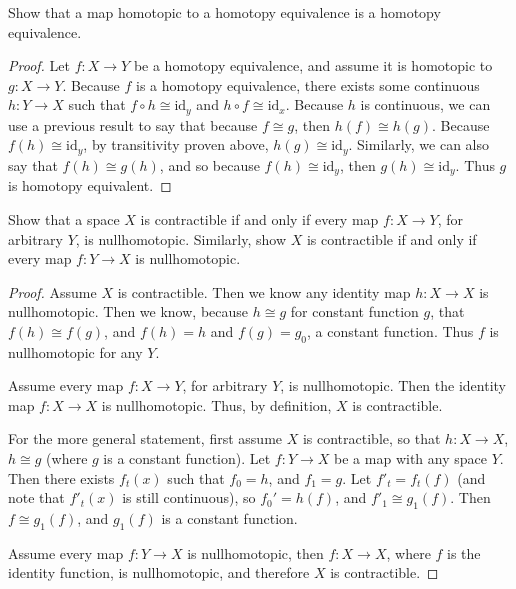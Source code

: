 \documentclass[12pt]{article}
\newenvironment{statement}[2][Statement]{\begin{trivlist}
\item[\hskip \labelsep {\bfseries #1}\hskip \labelsep {\bfseries #2.}]}{\end{trivlist}}
\begin{document}
\begin{statement}[Exercise]{0.3c}
    Show that a map homotopic to a homotopy equivalence is a homotopy equivalence. 
\end{statement}
\begin{proof}
    Let $f: X \to Y$ be a homotopy equivalence, and assume it is homotopic to $g: X \to Y$. Because $f$ is a homotopy equivalence, there exists some continuous $h: Y \to X$ such that $f \circ h \cong \text{id}_y$ and $h \circ f \cong \text{id}_x$. Because $h$ is continuous, we can use a previous result to say that because $f \cong g$, then $h(f) \cong h(g)$. Because $f(h) \cong \text{id}_y$, by transitivity proven above, $h(g) \cong \text{id}_y$. Similarly, we can also say that $f(h) \cong g(h)$, and so because $f(h) \cong \text{id}_y$, then $g(h) \cong \text{id}_y$. Thus $g$ is homotopy equivalent. 
\end{proof}

\begin{statement}[Exercise]{0.10}
    Show that a space $X$ is contractible if and only if every map $f:X \to Y$, for arbitrary $Y$, is nullhomotopic. Similarly, show $X$ is contractible if and only if every map $f: Y \to X$ is nullhomotopic.
\end{statement}
\begin{proof}
    Assume $X$ is contractible. Then we know any identity map $h: X \to X$ is nullhomotopic. Then we know, because $h \cong g$ for constant function $g$, that $f(h) \cong f(g)$, and $f(h)=h$ and $f(g)=g_0$, a constant function. Thus $f$ is nullhomotopic for any $Y$. 
    \par Assume every map $f:X \to Y$, for arbitrary $Y$, is nullhomotopic. Then the identity map $f: X \to X$ is nullhomotopic. Thus, by definition, $X$ is contractible.
    \par For the more general statement, first assume $X$ is contractible, so that $h:X \to X$, $h \cong g$ (where $g$ is a constant function). Let $f: Y \to X$ be a map with any space $Y$. Then there exists $f_t(x)$ such that $f_0=h$, and $f_1=g$. Let $f'_t=f_t(f)$ (and note that $f'_t(x)$ is still continuous), so $f_0'=h(f)$, and $f'_1 \cong g_1(f)$. Then $f \cong g_1(f)$, and $g_1(f)$ is a constant function.
    \par Assume every map $f: Y \to X$ is nullhomotopic, then $f: X \to X$, where $f$ is the identity function, is nullhomotopic, and therefore $X$ is contractible. 
\end{proof}
\end{document}

